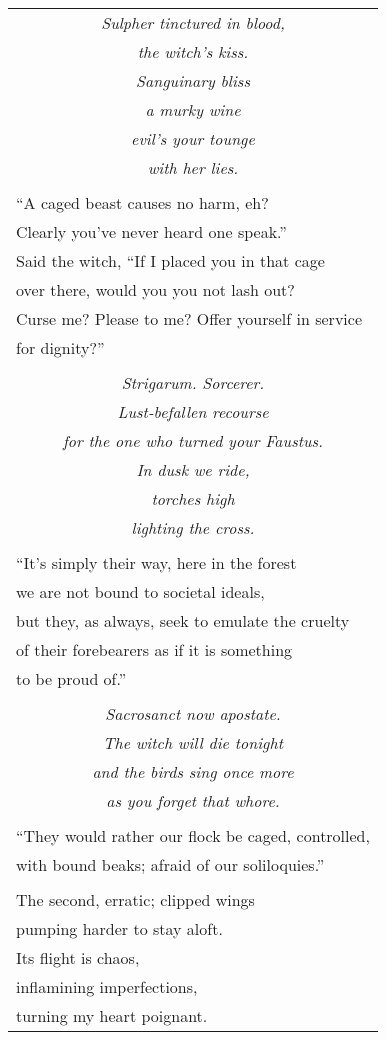 \documentclass{article}
\begin{document}
\begin{center}
\begin{longtable}{l}
\multicolumn{1}{c}{\textit{Sulpher tinctured in blood,}} \\
\multicolumn{1}{c}{\textit{the witch's kiss.}} \\
\multicolumn{1}{c}{\textit{Sanguinary bliss}} \\
\multicolumn{1}{c}{\textit{a murky wine}} \\
\multicolumn{1}{c}{\textit{evil's your tounge}} \\
\multicolumn{1}{c}{\textit{with her lies.}} \\
\\
``A caged beast causes no harm, eh? \\
Clearly you've never heard one speak.'' \\
Said the witch, ``If I placed you in that cage \\
over there, would you you not lash out? \\
Curse me? Please to me? Offer yourself in service \\
for dignity?'' \\
\\
\multicolumn{1}{c}{\textit{Strigarum. Sorcerer.}} \\
\multicolumn{1}{c}{\textit{Lust-befallen recourse}} \\
\multicolumn{1}{c}{\textit{for the one who turned your Faustus.}} \\
\multicolumn{1}{c}{\textit{In dusk we ride,}} \\
\multicolumn{1}{c}{\textit{torches high}} \\
\multicolumn{1}{c}{\textit{lighting the cross.}} \\
\\
``It's simply their way, here in the forest \\
we are not bound to societal ideals, \\
but they, as always, seek to emulate the cruelty \\
of their forebearers as if it is something \\
to be proud of.'' \\
\\
\multicolumn{1}{c}{\textit{Sacrosanct now apostate.}} \\
\multicolumn{1}{c}{\textit{The witch will die tonight}} \\
\multicolumn{1}{c}{\textit{and the birds sing once more}} \\
\multicolumn{1}{c}{\textit{as you forget that whore.}} \\
\\
``They would rather our flock be caged, controlled, \\
with bound beaks; afraid of our soliloquies.'' \\
\\
The second, erratic; clipped wings \\
pumping harder to stay aloft. \\
Its flight is chaos, \\
inflamining imperfections, \\
turning my heart poignant. \\

\end{longtable}
\end{center}
\end{document}
